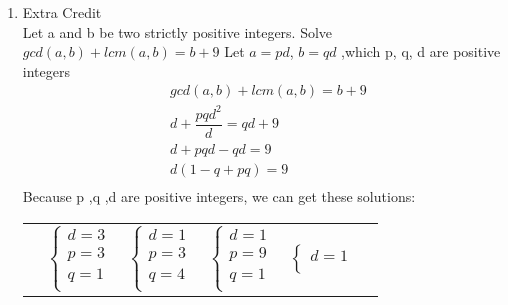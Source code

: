 \documentclass{article}
\theoremstyle{definition}
\theoremstyle{plain}
\begin{document}
\begin {enumerate}[itemindent=30pt,label=\bf Exercise {\arabic*}:]
\subitem Because n is not a prime, $ n = 1*p*q$, $(p,q) \in \mathbb{Z}^{+}$
\subitem Because m,n may not be prime, the sum of n's divisors must greater than  or equal to $1 + p + q + n $, which is greater than $n +1$. This is contradict with my assumption. So we can conclude that if n is a positive integer such that the sum of its divisors is $n+1$, then n is prime.
\item Extra Credit\\ Let a and b be two strictly positive integers. Solve $gcd(a,b)+lcm(a,b) = b + 9$
\subitem Let $a = pd$, $b = qd$ ,which p, q, d are positive integers
\begin{align*}
	& gcd(a,b)+lcm(a,b) = b + 9 \\
	& d + \dfrac{pqd^2}{d} = qd + 9\\
	& d + pqd - qd = 9\\
	& d(1 - q + pq) = 9\\
\end{align*}
\subitem Because p ,q ,d are positive integers, we can get these solutions:\\
\begin{tabularx}{300pt}{XXXXXX} 
\qquad &
  \begin{equation*}
  \left\{
   \begin{aligned}
   	d = 3\\
    p = 3\\
    q = 1\\
   \end{aligned}
  \right.
\end{equation*}&
\begin{equation*}
  \left\{
   \begin{aligned}
   	d = 1\\
    p = 3\\
    q = 4\\
   \end{aligned}
  \right.
\end{equation*}&
\begin{equation*}
  \left\{
   \begin{aligned}
   	d = 1\\
    p = 9\\
    q = 1\\
   \end{aligned}
  \right.
\end{equation*} &
\begin{equation*}
  \left\{
   \begin{aligned}
   	d = 1\\

\end{aligned}
\end{equation*}
\end{tabularx}
\end{enumerate}
\end{document}
